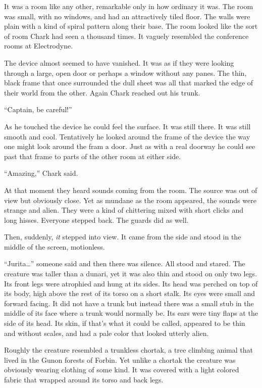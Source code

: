 It was a room like any other, remarkable only in how ordinary it was. The room was small, with
no windows, and had an attractively tiled floor. The walls were plain with a kind of spiral
pattern along their base. The room looked like the sort of room Chark had seen a thousand times.
It vaguely resembled the conference rooms at Electrodyne.

The device almost seemed to have vanished. It was as if they were looking through a large, open
door or perhaps a window without any panes. The thin, black frame that once surrounded the dull
sheet was all that marked the edge of their world from the other. Again Chark reached out his
trunk.

``Captain, be careful!''

As he touched the device he could feel the surface. It was still there. It was still smooth and
cool. Tentatively he looked around the frame of the device the way one might look around the
fram a door. Just as with a real doorway he could see past that frame to parts of the other room
at either side.

``Amazing,'' Chark said.

At that moment they heard sounds coming from the room. The source was out of view but obviously
close. Yet as mundane as the room appeared, the sounds were strange and alien. They were a kind
of chittering mixed with short clicks and long hisses. Everyone stepped back. The guards did as
well.

Then, suddenly, \emph{it} stepped into view. It came from the side and stood in the middle of
the screen, motionless.

``Jurita\ldots'' someone said and then there was silence. All stood and stared. The creature was
taller than a dunari, yet it was also thin and stood on only two legs. Its front legs were
atrophied and hung at its sides. Its head was perched on top of its body, high above the rest of
its torso on a short stalk. Its eyes were small and forward facing. It did not have a trunk but
instead there was a small stub in the middle of its face where a trunk would normally be. Its
ears were tiny flaps at the side of its head. Its skin, if that's what it could be called,
appeared to be thin and without scales, and had a pale color that looked utterly alien.

Roughly the creature resembled a trunkless chortak, a tree climbing animal that lived in the
Gunon forests of Forbin. Yet unlike a chortak the creature was obviously wearing clothing of
some kind. It was covered with a light colored fabric that wrapped around its torso and back
legs.

